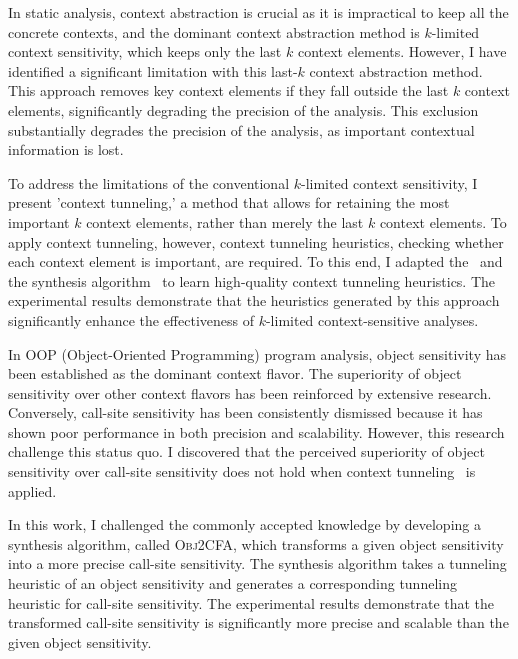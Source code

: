 \documentclass[11pt]{article}
\newcommand{\myparagraph}[1]{\medskip\noindent{\it \textbf{#1.}}}
\begin{document}
\myparagraph{Context Tunneling~\cite{JeJeOh18}}
%
In static analysis, context abstraction is crucial as it is impractical to keep all the concrete contexts, and the dominant context abstraction method is $k$-limited context sensitivity, which keeps only the last $k$ context elements.
%
However, I have identified a significant limitation with this last-$k$ context abstraction method.
%
This approach removes key context elements if they fall outside the last $k$ context elements, significantly degrading the precision of the analysis.
%
This exclusion substantially degrades the precision of the analysis, as important contextual information is lost.





To address the limitations of the conventional $k$-limited context sensitivity, I present 'context tunneling,' a method that allows for retaining the most important $k$ context elements, rather than merely the last $k$ context elements.
%
To apply context tunneling, however, context tunneling heuristics, checking whether each context element is important, are required.
%
To this end, I adapted the \DisjunctiveModel~and the synthesis algorithm~\cite{JeJeChOh17} to learn high-quality context tunneling heuristics.
%
The experimental results demonstrate that the heuristics generated by this approach significantly enhance the effectiveness of $k$-limited context-sensitive analyses.



\myparagraph{Obj2CFA~\cite{JeOh22}}
%
In OOP (Object-Oriented Programming) program analysis, object sensitivity has been established as the dominant context flavor.
%
The superiority of object sensitivity over other context flavors has been reinforced by extensive research.
%
Conversely, call-site sensitivity has been consistently dismissed because it has shown poor performance in both precision and scalability.
%
However, this research challenge this status quo. 
I discovered that the perceived superiority of object sensitivity over call-site sensitivity does not hold when context tunneling~\cite{JeJeOh18} is applied.


In this work, I challenged the commonly accepted knowledge by developing a synthesis algorithm, called \textsc{Obj2CFA}, which transforms a given object sensitivity into a more precise call-site sensitivity.
%
The synthesis algorithm takes a tunneling heuristic of an object sensitivity and generates a corresponding tunneling heuristic for call-site sensitivity.
%
The experimental results demonstrate that the transformed call-site sensitivity is significantly more precise and scalable than the given object sensitivity.
\end{document}
